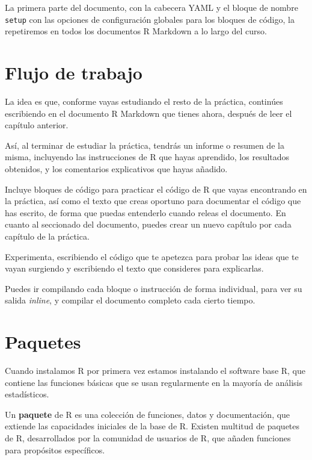 \documentclass[
  degree=mecinf,
  title=normal,
  toc=normal,
  bib=normal]{mnye}
\begin{document}
La primera parte del documento, con la cabecera YAML y el bloque de nombre \texttt{setup} con las opciones de configuración globales para los bloques de código, la repetiremos en todos los documentos R Markdown a lo largo del curso.

\hypertarget{flow}{%
\section{Flujo de trabajo}\label{flow}}

La idea es que, conforme vayas estudiando el resto de la práctica, continúes escribiendo en el documento R Markdown que tienes ahora, después de leer el capítulo anterior.

Así, al terminar de estudiar la práctica, tendrás un informe o resumen de la misma, incluyendo las instrucciones de \textsf{R} que hayas aprendido, los resultados obtenidos, y los comentarios explicativos que hayas añadido.

Incluye bloques de código para practicar el código de \textsf{R} que vayas encontrando en la práctica, así como el texto que creas oportuno para documentar el código que has escrito, de forma que puedas entenderlo cuando releas el documento. En cuanto al seccionado del documento, puedes crear un nuevo capítulo por cada capítulo de la práctica.

Experimenta, escribiendo el código que te apetezca para probar las ideas que te vayan surgiendo y escribiendo el texto que consideres para explicarlas.

Puedes ir compilando cada bloque o instrucción de forma individual, para ver su salida \emph{inline}, y compilar el documento completo cada cierto tiempo.

\hypertarget{packages}{%
\section{Paquetes}\label{packages}}

Cuando instalamos \textsf{R} por primera vez estamos instalando el software \textsf{base R}, que contiene las funciones básicas que se usan regularmente en la mayoría de análisis estadísticos.

Un \textbf{paquete} de R es una colección de funciones, datos y documentación, que extiende las capacidades iniciales de la base de \textsf{R}. Existen multitud de paquetes de \textsf{R}, desarrollados por la comunidad de usuarios de \textsf{R}, que añaden funciones para propósitos específicos.
\end{document}
